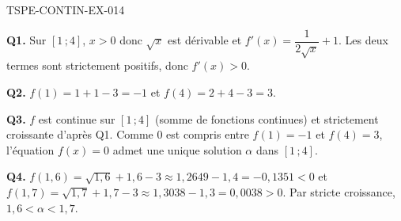 \begin{corrige}{TSPE-CONTIN-EX-014}

\textbf{Q1.} Sur $[1\,;4]$, $x > 0$ donc $\sqrt{x}$ est dérivable et $f'(x) = \dfrac{1}{2\sqrt{x}} + 1$. Les deux termes sont strictement positifs, donc $f'(x) > 0$.

\textbf{Q2.} $f(1) = 1 + 1 - 3 = -1$ et $f(4) = 2 + 4 - 3 = 3$.

\textbf{Q3.} $f$ est continue sur $[1\,;4]$ (somme de fonctions continues) et strictement croissante d'après Q1. Comme $0$ est compris entre $f(1) = -1$ et $f(4) = 3$, l'équation $f(x) = 0$ admet une unique solution $\alpha$ dans $[1\,;4]$.

\textbf{Q4.} $f(1{,}6) = \sqrt{1{,}6} + 1{,}6 - 3 \approx 1{,}2649 - 1{,}4 = -0{,}1351 < 0$ et $f(1{,}7) = \sqrt{1{,}7} + 1{,}7 - 3 \approx 1{,}3038 - 1{,}3 = 0{,}0038 > 0$. Par stricte croissance, $1{,}6 < \alpha < 1{,}7$.
\end{corrige}
